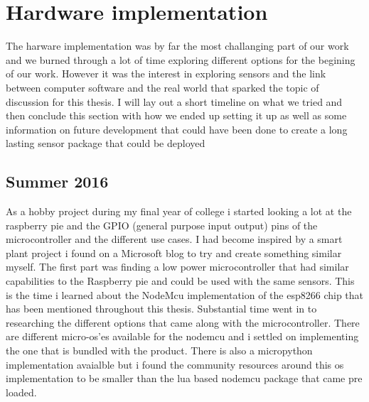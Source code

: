 \documentclass[]{uiophd}
\begin{document}
  
\section{Hardware implementation}
The harware implementation was by far the most challanging part of our work and we burned through a lot of time exploring different options for the begining of our work. However it was the interest in exploring sensors and the link between computer software and the real world that sparked the topic of discussion for this thesis. I will lay out a short timeline on what we tried and then conclude this section with how we ended up setting it up as well as some information on future development that could have been done to create a long lasting sensor package that could be deployed 
\subsection{Summer 2016}
As a hobby project during my final year of college i started looking a lot at the raspberry pie and the GPIO (general purpose input output) pins of the microcontroller and the different use cases. I had become inspired by a smart plant project i found on a Microsoft blog to try and create something similar myself. The first part was finding a low power microcontroller that had similar capabilities to the Raspberry pie and could be used with the same sensors. This is the time i learned about the NodeMcu implementation of the esp8266 chip that has been mentioned throughout this thesis. Substantial time went in to researching the different options that came along with the microcontroller. There are different micro-os'es available for the nodemcu and i settled on implementing the one that is bundled with the product. There is also a micropython implementation avaialble but i found the community resources around this os implementation to be smaller than the lua based nodemcu package that came pre loaded.
\end{document}
